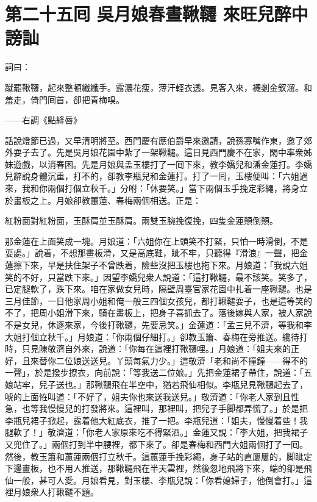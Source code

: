
\chapter*{第二十五囘 吳月娘春晝鞦韆 來旺兒醉中謗訕}


詞曰：

蹴罷鞦韆，起來整頓纖纖手。露濃花瘦，薄汗輕衣透。見客入來，襪剗金釵溜。和羞走，倚門囘首，卻把青梅嗅。

——右調《點絳唇》

話說燈節已過，又早清明將至。西門慶有應伯爵早來邀請，說孫寡嘴作東，邀了郊外耍子去了。先是吳月娘花園中紮了一架鞦韆。這日見西門慶不在家，閑中率衆姊妹遊戲，以消春困。先是月娘與孟玉樓打了一囘下來，教李嬌兒和潘金蓮打。李嬌兒辭說身體沉重，打不的，卻教李瓶兒和金蓮打。打了一囘，玉樓便叫：「六姐過來，我和你兩個打個立秋千。」分咐：「休要笑。」當下兩個玉手挽定彩繩，將身立於畫板之上。月娘卻教蕙蓮、春梅兩個相送。正是：

紅粉面對紅粉面，玉酥肩並玉酥肩。兩雙玉腕挽復挽，四隻金蓮顛倒顛。

那金蓮在上面笑成一塊。{}月娘道：「六姐你在上頭笑不打緊，只怕一時滑倒，不是耍處。」說着，不想那畫板滑，又是高底鞋，跐不牢，只聽得『滑浪』一聲，把金蓮擦下來，{}早是扶住架子不曾跌着，險些沒把玉樓也拖下來。月娘道：「我說六姐笑的不好，只當跌下來。」{}因望李嬌兒衆人說道：「這打鞦韆，最不該笑。笑多了，已定腿軟了，跌下來。咱在家做女兒時，隔壁周臺官家花園中扎着一座鞦韆。也是三月佳節，一日他家周小姐和俺一般三四個女孩兒，都打鞦韆耍子，也是這等笑的不了，把周小姐滑下來，騎在畫板上，把身子喜抓去了。落後嫁與人家，被人家說不是女兒，休逐來家，今後打鞦韆，先要忌笑。」金蓮道：「孟三兒不濟，{}等我和李大姐打個立秋千。」月娘道：「你兩個仔細打。」卻教玉簫、春梅在旁推送。纔待打時，只見陳敬濟自外來，說道：「你每在這裡打鞦韆哩。」月娘道：「姐夫來的正好，且來替你二位娘送送兒。丫頭每氣力少。」這敬濟「老和尚不撞鐘——得不的一聲」，於是撥步撩衣，向前說：「等我送二位娘。」先把金蓮裙子帶住，說道：「五娘站牢，兒子送也。」那鞦韆飛在半空中，猶若飛仙相似。李瓶兒見鞦韆起去了，唬的上面恠叫道：「不好了，姐夫你也來送我送兒。」敬濟道：「你老人家到且性急，也等我慢慢兒的打發將來。這裡叫，那裡叫，把兒子手脚都弄慌了。」於是把李瓶兒裙子掀起，露着他大紅底衣，推了一把。李瓶兒道：「姐夫，慢慢着些！我腿軟了！」敬濟道：「你老人家原來吃不得緊酒。」金蓮又說：「李大姐，把我裙子又兜住了。」兩個打到半中腰裡，都下來了。卻是春梅和西門大姐兩個打了一囘。然後，教玉簫和蕙蓮兩個打立秋千。這蕙蓮手挽彩繩，身子站的直屢屢的，脚跐定下邊畫板，也不用人推送，那鞦韆飛在半天雲裡，然後忽地飛將下來，端的卻是飛仙一般，甚可人愛。{}月娘看見，對玉樓、李瓶兒說：「你看媳婦子，他倒會打。」這裡月娘衆人打鞦韆不題。

